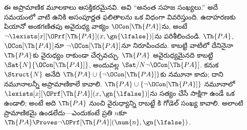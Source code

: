 \documentclass[../../../include/open-logic-section]{subfiles}
\begin{document}
ఈ అప్రామాణిక మూలకాలు ఆసక్తికరమైనవి. అవి ``అనంత సహజ సంఖ్యలు.''
అదే సమయంలో వాటి ఉనికి అసంపూర్ణత ఫలితాలను ఒక విధంగా వివరిస్తుంది.
ఉదాహరణకు పియానో అంకగణితపు అవైరుధ్య వాక్యం $\OCon[\Th{PA}]$ను,
అంటే $\lnot\lexists[x][\OPrf[\Th{PA}](x,\gn{\lfalse})]$ను
పరిశీలించండి. $\Th{PA}$, $\OCon[\Th{PA}]$నూ
$\lnot\OCon[\Th{PA}]$నూ నిరూపించదు. కాబట్టి వాటిలో దేనినైనా
$\Th{PA}$కు వైరుధ్యం రాకుండా చేర్చవచ్చు. $\Th{PA}$ అవైరుధ్యమైనది కాబట్టి
$\Sat{N}{\OCon[\Th{PA}]}$, అందువల్ల
$\Sat/{N}{\lnot\OCon[\Th{PA}]}$. కనుక $\Struct{N}$ అనేది
$\Th{PA}\cup\{\lnot\OCon[\Th{PA}]\}$కు నమూనా కాదు; దాని నమూనాలన్నీ
అప్రామాణికాలే కావాలి. $\Th{PA}\cup\{\lnot\OCon[\Th{PA}]\}$ నమూనాలో
$\lexists[x][\OPrf[\Th{PA}](x,\gn{\lfalse})]$ను సత్యం చేసే
సాక్షిగా ఉండే ఒక  ఉండాలి; అంటే అది
$\Th{PA}$ నుంచి వైరుధ్యాన్ని రాబట్టే
కి గోడెల్ సంఖ్య కావాలి.
అలాంటి  ప్రామాణికమై ఉండలేదు---ఎందుకంటే
ప్రతి $n$కూ
$\Th{PA}\Proves\lnot\OPrf[\Th{PA}](\num{n},\gn{\lfalse})$.
\end{document}

